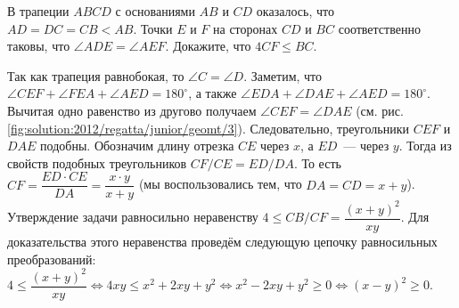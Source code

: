 В трапеции $ABCD$ с основаниями $AB$ и $CD$ оказалось, что $AD = DC = CB < AB$.
Точки $E$ и $F$ на сторонах $CD$ и $BC$ соответственно таковы, что
$\angle ADE = \angle AEF$.
Докажите, что $4 CF \leq BC$.

%
\label{solution:2012/regatta/junior/geomt/3}%
Так как трапеция равнобокая, то $\angle C = \angle D$.
Заметим, что
$\angle CEF + \angle FEA + \angle AED = 180^\circ$, а также
$\angle EDA + \angle DAE + \angle AED = 180^\circ$.
Вычитая одно равенство из другово получаем $\angle CEF = \angle DAE$
(см. рис. \ref{fig:solution:2012/regatta/junior/geomt/3}).
Следовательно, треугольники $CEF$ и $DAE$ подобны.
Обозначим длину отрезка $CE$ через $x$, а $ED$~--- через $y$.
Тогда из свойств подобных треугольников $CF / CE = ED / DA$.
То есть $CF = \dfrac{ED \cdot CE}{DA} = \dfrac{x \cdot y}{x + y}$
(мы воспользовались тем, что $DA = CD = x + y$).
Утверждение задачи равносильно неравенству
$4 \leq CB / CF = \dfrac{(x + y)^2}{xy}$.
Для доказательства этого неравенства проведём следующую цепочку равносильных преобразований:
\(
    4 \leq \dfrac{(x + y)^2}{xy}
\Leftrightarrow
    4 x y \leq x^2 + 2 x y + y^2
\Leftrightarrow
    x^2 - 2 x y + y^2 \geq 0
\Leftrightarrow
    (x - y)^2 \geq 0
\).

